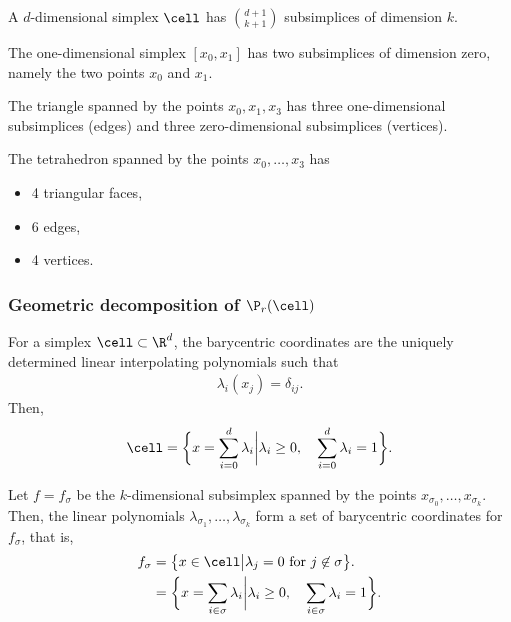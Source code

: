 \begin{example}
  A $d$-dimensional simplex $\cell$ has $\binom{d+1}{k+1}$
  subsimplices of dimension $k$.

  The one-dimensional simplex $[x_0,x_1]$ has two subsimplices of
  dimension zero, namely the two points $x_0$ and $x_1$.

  The triangle spanned by the points $x_0, x_1, x_3$ has three
  one-dimensional subsimplices (edges) and three zero-dimensional
  subsimplices (vertices).

  The tetrahedron spanned by the points $x_0,\dots,x_3$ has
  \begin{itemize}
  \item 4 triangular faces,
  \item 6 edges,
  \item 4 vertices.
  \end{itemize}
\end{example}

\subsubsection{Geometric decomposition of $\P_r(\cell)$}

\begin{remark}
  For a simplex $\cell\subset\R^d$, the barycentric coordinates are
  the uniquely determined linear interpolating polynomials such that
  \begin{gather}
    \lambda_i(x_j) = \delta_{ij}.
  \end{gather}
  Then,
  \begin{gather}
    \cell = \biggl\{ x = \sum_{i=0}^d\lambda_i\bigg\vert
    \lambda_i \ge 0,\quad\sum_{i=0}^d\lambda_i = 1\biggr\}.
  \end{gather}

  Let $f=f_\sigma$ be the $k$-dimensional subsimplex spanned by the
  points $x_{\sigma_0},\dots,x_{\sigma_k}$. Then, the linear
  polynomials $\lambda_{\sigma_1},\dots,\lambda_{\sigma_k}$ form a set
  of barycentric coordinates for $f_\sigma$, that is,
  \begin{gather}
    \begin{split}
      f_\sigma &= \bigl\{x\in\cell \big\vert
      \lambda_j=0 \text{ for } j\not\in\sigma\bigr\}.
      \\
      &= \biggl\{ x = \sum_{i\in\sigma}\lambda_i\bigg\vert
    \lambda_i \ge 0,\quad\sum_{i\in\sigma}\lambda_i = 1\biggr\}.
    \end{split}
  \end{gather}
\end{remark}

